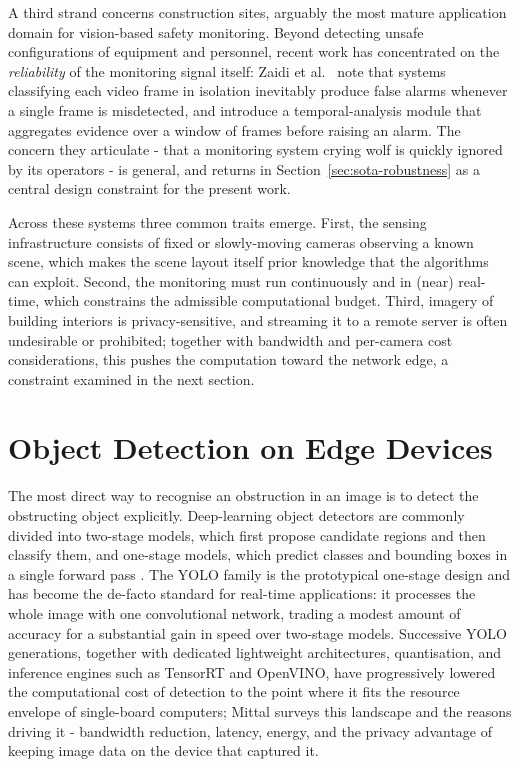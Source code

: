 A third strand concerns construction sites, arguably the most mature
application domain for vision-based safety monitoring. Beyond detecting unsafe
configurations of equipment and personnel, recent work has concentrated on the
\emph{reliability} of the monitoring signal itself: Zaidi et
al.~\cite{Zaidi2024} note that systems classifying each video frame in
isolation inevitably produce false alarms whenever a single frame is
misdetected, and introduce a temporal-analysis module that aggregates evidence
over a window of frames before raising an alarm. The concern they articulate -
that a monitoring system crying wolf is quickly ignored by its operators - is
general, and returns in Section~\ref{sec:sota-robustness} as a central design
constraint for the present work.

Across these systems three common traits emerge. First, the sensing
infrastructure consists of fixed or slowly-moving cameras observing a known
scene, which makes the scene layout itself prior knowledge that the algorithms
can exploit. Second, the monitoring must run continuously and in (near)
real-time, which constrains the admissible computational budget. Third, imagery
of building interiors is privacy-sensitive, and streaming it to a remote server
is often undesirable or prohibited; together with bandwidth and per-camera cost
considerations, this pushes the computation toward the network edge, a
constraint examined in the next section.

\section{Object Detection on Edge Devices}
\label{sec:sota-detection}

The most direct way to recognise an obstruction in an image is to detect the
obstructing object explicitly. Deep-learning object detectors are commonly
divided into two-stage models, which first propose candidate regions and then
classify them, and one-stage models, which predict classes and bounding boxes in
a single forward pass \cite{Mittal2024}. The YOLO family \cite{Redmon2016} is
the prototypical one-stage design and has become the de-facto standard for
real-time applications: it processes the whole image with one convolutional
network, trading a modest amount of accuracy for a substantial gain in
speed over two-stage models. Successive YOLO generations, together with
dedicated lightweight architectures, quantisation, and inference engines such as
TensorRT and OpenVINO, have progressively lowered the computational cost of
detection to the point where it fits the resource envelope of single-board
computers; Mittal \cite{Mittal2024} surveys this landscape and the reasons
driving it - bandwidth reduction, latency, energy, and the privacy advantage of
keeping image data on the device that captured it.

